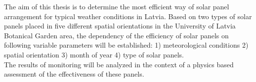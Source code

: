 The aim of this thesis is to determine the most efficient way of solar panel arrangement for typical weather conditions in Latvia. 
Based on two types of solar panels placed in five different spatial orientations in the University of Latvia Botanical Garden area, the dependency of the efficiency of solar panels on following variable parameters will be established:
1) meteorological conditions
2) spatial orientation
3) month of year
4) type of solar panels.\\
The results of monitoring will be analyzed in the context of a physics based assessment of the effectiveness of these panels.

